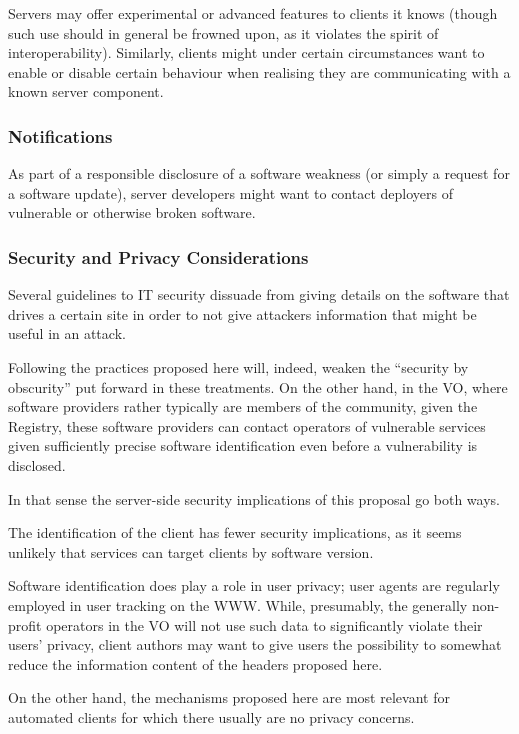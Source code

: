 \documentclass[11pt,a4paper]{ivoa}
\begin{document}
Servers may offer experimental or advanced features to clients it knows
(though such use should in general be frowned upon, as it violates the
spirit of interoperability).  Similarly, clients might under certain
circumstances want to enable or disable certain behaviour when realising
they are communicating with a known server component.

\subsubsection{Notifications}

As part of a responsible disclosure of a software weakness (or simply a
request for a software update), server developers might want to contact
deployers of vulnerable or otherwise broken software.

\subsubsection{Security and Privacy Considerations}

Several guidelines to IT security dissuade from giving details on the
software that drives a certain site in order to not give attackers
information that might be useful in an attack.

Following the practices proposed here will, indeed, weaken the
``security by obscurity'' put forward in these treatments.  On the other
hand, in the VO, where software providers rather typically are members
of the community, given the Registry, these software providers can contact
operators of vulnerable services given sufficiently precise software
identification even before a vulnerability is disclosed.

In that sense the server-side security implications of this proposal go
both ways.

The identification of the client has fewer security implications, as it
seems unlikely that services can target clients by software version.

Software identification does play a role in user privacy; user agents
are regularly employed in user tracking on the WWW.  While, presumably,
the generally non-profit operators in the VO will not use such data to
significantly violate their users' privacy, client authors may want to
give users the possibility to somewhat reduce the information content of
the headers proposed here.

On the other hand, the mechanisms proposed here are most relevant for
automated clients for which there usually are no privacy concerns.
\end{document}

